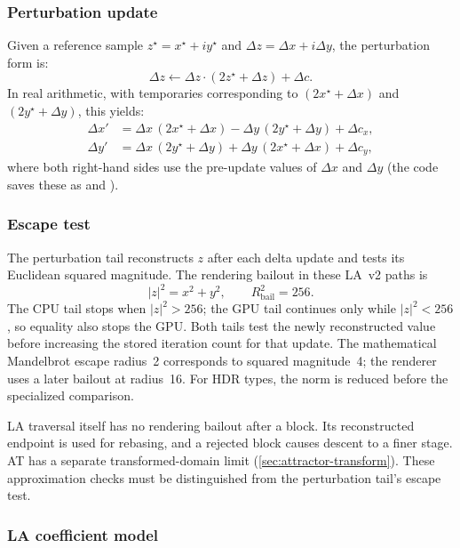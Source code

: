\subsubsection{Perturbation update}
Given a reference sample \(z^\star=x^\star+iy^\star\) and \(\Delta z=\Delta
x+i\Delta y\), the perturbation form is:
\[
\Delta z \leftarrow \Delta z\cdot(2z^\star+\Delta z) + \Delta c.
\]
In real arithmetic, with temporaries corresponding to \((2x^\star+\Delta x)\)
and \((2y^\star+\Delta y)\), this yields:
\begin{align}
\Delta x' &= \Delta x\,(2x^\star+\Delta x) - \Delta y\,(2y^\star+\Delta y) + \Delta c_x, \\
\Delta y' &= \Delta x\,(2y^\star+\Delta y) + \Delta y\,(2x^\star+\Delta x) + \Delta c_y,
\end{align}
where both right-hand sides use the pre-update values of \(\Delta x\) and
\(\Delta y\) (the code saves these as  and
).

\subsubsection{Escape test}
The perturbation tail reconstructs $z$ after each delta update and tests
its Euclidean squared magnitude. The rendering bailout in these LA~v2
paths is
\[
|z|^2=x^2+y^2,\qquad R_{\mathrm{bail}}^2=256.
\]
The CPU tail stops when $|z|^2>256$; the GPU tail continues only while
$|z|^2<256$, so equality also stops the GPU. Both tails test the newly
reconstructed value before increasing the stored iteration count for
that update. The mathematical Mandelbrot escape radius~2 corresponds
to squared magnitude~4; the renderer uses a later bailout at radius~16.
For HDR types, the norm is reduced before the specialized comparison.

LA traversal itself has no rendering bailout after a block. Its
reconstructed endpoint is used for rebasing, and a rejected block
causes descent to a finer stage. AT has a separate transformed-domain
limit (\cref{sec:attractor-transform}). These approximation checks
must be distinguished from the perturbation tail's escape test.

\subsubsection{LA coefficient model}
\label{sec:la-coeff-model}

